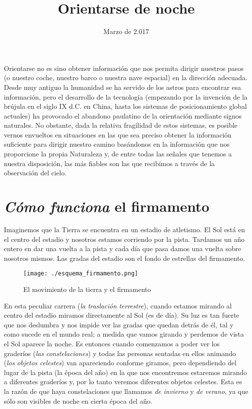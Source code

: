 \documentclass[10pt,a5paper,twoside]{amsbook}
\title{Orientarse de noche}
\date{Marzo de 2.017}
\begin{document}
\titulo

\tableofcontents

\cleardoublepage

\begin{sumario}
Orientarse no es sino obtener información que nos permita dirigir nuestros pasos (o nuestro coche, nuestro barco o nuestra nave espacial) en la dirección adecuada. Desde muy antiguo la humanidad se ha servido de los astros para encontrar esa información, pero el desarrollo de la tecnología (empezando por la invención de la brújula en el siglo IX d.C. en China, hasta los sistemas de posicionamiento global actuales) ha provocado el abandono paulatino de la orientación mediante signos naturales. No obstante, dada la relativa fragilidad de estos sistemas, es posible vernos envueltos en situaciones en las que sea preciso obtener la información suficiente para dirigir nuestro camino basándonos en la información que nos proporcione la propia Naturaleza y, de entre todas las señales que tenemos a nuestra disposición, las más fiables son las que recibimos a través de la observación del cielo.
\end{sumario}

\chapter*{\textit{Cómo funciona} el firmamento}

Imaginemos que la Tierra se encuentra en un estadio de atletismo. El Sol está en el centro del estadio y nosotros estamos corriendo por la pista. Tardamos un año entero en dar una vuelta a la pista y cada día que pasa damos una vuelta sobre nosotros mismos. Las gradas del estadio son el fondo de estrellas del firmamento. 


\begin{figure}[ht]
 \centering
 \texttt{[image: ./esquema\_firmamento.png]}
 \caption{El movimiento de la tierra y el firmamento}
 \label{carrera_tierra}
\end{figure}

En esta peculiar carrera (\textit{la traslación terrestre}), cuando estamos mirando al centro del estadio miramos directamente al Sol (es de día). Su luz es tan fuerte que nos deslumbra y nos impide ver las gradas que quedan detrás de él, tal y como sucede en el mundo real; a medida que vamos girando y perdemos de vista el Sol aparece la noche. Es entonces cuando comenzamos a poder ver los graderíos (\textit{las constelaciones}) y todas las personas sentadas en ellos animando (\textit{los objetos celestes}) van apareciendo conforme giramos, pero dependiendo del lugar de la pista (la época del año) en la que nos encontremos estaremos mirando a diferentes graderíos y, por lo tanto veremos diferentes objetos celestes. Esta es la razón de que haya constelaciones que llamamos \textit{de invierno} y \textit{de verano}, ya que sólo son visibles de noche en cierta época del año.
\end{document}
